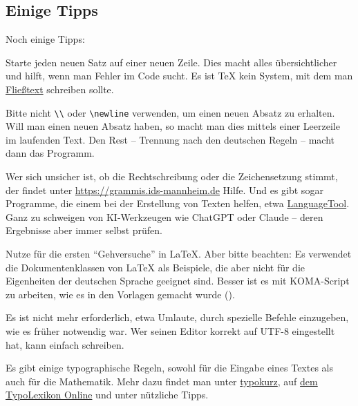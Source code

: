 \subsection{Einige Tipps }
Noch einige Tipps: 

\begin{myenumerate}
	\item
	Starte jeden neuen Satz auf einer neuen Zeile.
	Dies macht alles übersichtlicher und hilft, wenn man Fehler im Code sucht.
	Es ist \TeX{} kein System, mit dem man \href{https://de.wikipedia.org/wiki/Fließtext}{Fließtext} schreiben sollte.
	
	\item
	Bitte nicht \verb!\\! oder \verb!\newline! verwenden, um einen neuen Absatz zu erhalten.
	Will man einen neuen Absatz haben, so macht man dies mittels einer Leerzeile im laufenden Text.
	Den Rest -- Trennung nach den deutschen Regeln \ua -- macht dann das Programm.
	
	\item
	Wer sich unsicher ist, ob die Rechtschreibung oder die Zeichensetzung stimmt, der findet unter 
	\href{https://grammis.ids-mannheim.de}{https://grammis.ids-mannheim.de} Hilfe.
	Und es gibt sogar Programme, die einem bei der Erstellung von Texten helfen, etwa \href{https://languagetool.org/de}{LanguageTool}.
	Ganz zu schweigen von KI-Werkzeugen wie ChatGPT oder Claude -- deren Ergebnisse aber immer selbst prüfen.
	
	\item
	Nutze \textcite{lshort-german} für die ersten \enquote{Gehversuche} in \LaTeX\@.
	Aber bitte beachten: Es verwendet die Dokumentenklassen von \LaTeX{} als Beispiele, die aber nicht für die Eigenheiten der deutschen Sprache geeignet sind.
	Besser ist es mit KOMA-Script zu arbeiten, wie es in den Vorlagen gemacht wurde (\textcite{kohm:2020}).
	
	\item
	Es ist nicht mehr erforderlich, etwa Umlaute, durch spezielle Befehle einzugeben, wie es früher notwendig war.
	Wer seinen Editor korrekt auf UTF-8 eingestellt hat, kann einfach schreiben.
	
	\item
	Es gibt einige typographische Regeln, sowohl für die Eingabe eines Textes als auch für die Mathematik.
	Mehr dazu findet man unter \href{http://menetekel.e-technik.fh-muenchen.de/skripten/LaTeX/typokurz.pdf}{typokurz}, auf \href{https://www.typolexikon.de}{dem TypoLexikon Online} und unter \textcite{nadler:formelsatz} nützliche Tipps.
	

\end{myenumerate}
